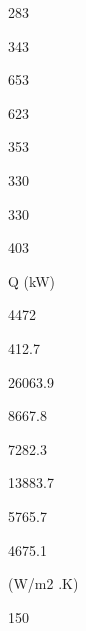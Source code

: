 \documentclass[a4paper,portrait,12pt]{article}
\begin{document}
283





343





653





623





353





330





330





403





\begin{flushleft}
Q (kW)
\end{flushleft}





4472





412.7





26063.9





8667.8





7282.3





13883.7





5765.7





4675.1





\begin{flushleft}
(W/m2 .K)
\end{flushleft}





150
\end{document}

